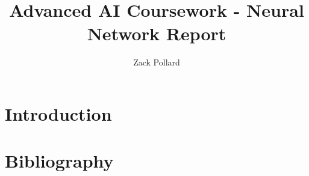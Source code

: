 \documentclass[10pt, a4paper]{article}
\begin{document}
\title{Advanced AI Coursework - Neural Network Report}
\author{Zack Pollard}
\maketitle

\tableofcontents

\newpage
\section{Introduction}


\newpage
\section{Bibliography}


\end{document}
